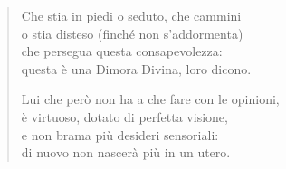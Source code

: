 \begin{quote}
Che stia in piedi o seduto, che cammini \\
o stia disteso (finché non s’addormenta) \\
che persegua questa consapevolezza: \\
questa è una Dimora Divina, loro dicono.

Lui che però non ha a che fare con le opinioni, \\
è virtuoso, dotato di perfetta visione, \\
e non brama più desideri sensoriali: \\
di nuovo non nascerà più in un utero.
\end{quote}


